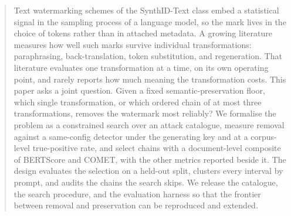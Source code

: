 \begin{abstract}
Text watermarking schemes of the SynthID-Text class embed a statistical signal in the sampling process of a language model, so the mark lives in the choice of tokens rather than in attached metadata. A growing literature measures how well such marks survive individual transformations: paraphrasing, back-translation, token substitution, and regeneration. That literature evaluates one transformation at a time, on its own operating point, and rarely reports how much meaning the transformation costs. This paper asks a joint question. Given a fixed semantic-preservation floor, which single transformation, or which ordered chain of at most three transformations, removes the watermark most reliably? We formalise the problem as a constrained search over an attack catalogue, measure removal against a same-config detector under the generating key and at a corpus-level true-positive rate, and select chains with a document-level composite of BERTScore and COMET, with the other metrics reported beside it. The design evaluates the selection on a held-out split, clusters every interval by prompt, and audits the chains the search skips. We release the catalogue, the search procedure, and the evaluation harness so that the frontier between removal and preservation can be reproduced and extended.
\end{abstract}
